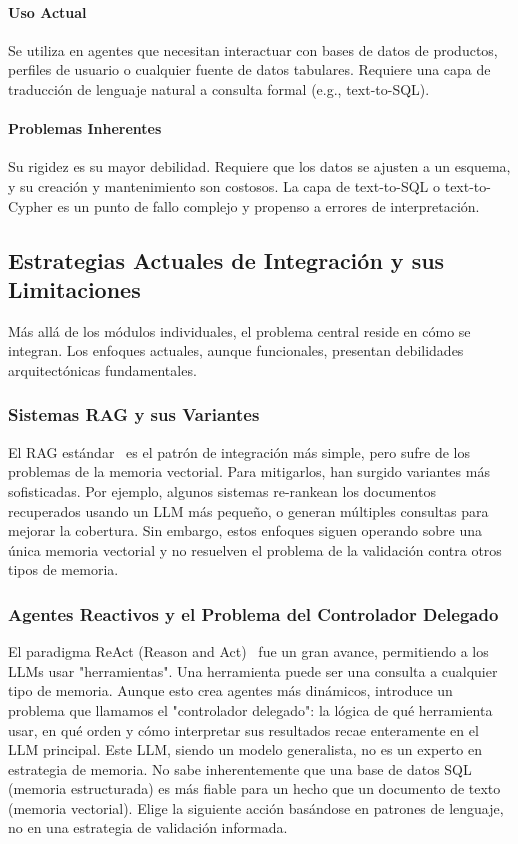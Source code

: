 \documentclass[journal,onecolumn]{IEEEtran}
\begin{document}
\paragraph{Uso Actual} Se utiliza en agentes que necesitan interactuar con bases de datos de productos, perfiles de usuario o cualquier fuente de datos tabulares. Requiere una capa de traducción de lenguaje natural a consulta formal (e.g., text-to-SQL).

\paragraph{Problemas Inherentes} Su rigidez es su mayor debilidad. Requiere que los datos se ajusten a un esquema, y su creación y mantenimiento son costosos. La capa de text-to-SQL o text-to-Cypher es un punto de fallo complejo y propenso a errores de interpretación.

\subsection{Estrategias Actuales de Integración y sus Limitaciones}
Más allá de los módulos individuales, el problema central reside en cómo se integran. Los enfoques actuales, aunque funcionales, presentan debilidades arquitectónicas fundamentales.

\subsubsection{Sistemas RAG y sus Variantes}
El RAG estándar~\cite{lewis2020retrieval} es el patrón de integración más simple, pero sufre de los problemas de la memoria vectorial. Para mitigarlos, han surgido variantes más sofisticadas. Por ejemplo, algunos sistemas re-rankean los documentos recuperados usando un LLM más pequeño, o generan múltiples consultas para mejorar la cobertura. Sin embargo, estos enfoques siguen operando sobre una única memoria vectorial y no resuelven el problema de la validación contra otros tipos de memoria.

\subsubsection{Agentes Reactivos y el Problema del Controlador Delegado}
El paradigma ReAct (Reason and Act)~\cite{yao2022react} fue un gran avance, permitiendo a los LLMs usar "herramientas". Una herramienta puede ser una consulta a cualquier tipo de memoria. Aunque esto crea agentes más dinámicos, introduce un problema que llamamos el "controlador delegado": la lógica de qué herramienta usar, en qué orden y cómo interpretar sus resultados recae enteramente en el LLM principal. Este LLM, siendo un modelo generalista, no es un experto en estrategia de memoria. No sabe inherentemente que una base de datos SQL (memoria estructurada) es más fiable para un hecho que un documento de texto (memoria vectorial). Elige la siguiente acción basándose en patrones de lenguaje, no en una estrategia de validación informada.
\end{document}
